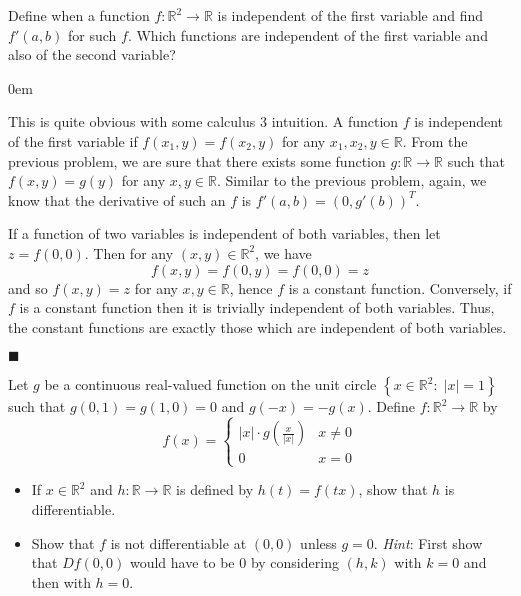 \documentclass[12pt]{article}
\renewcommand{\qed}{\hfill$\blacksquare$}
\renewenvironment{proof}{\begin{addmargin}[1em]{0em}\begin{newproof}}{\end{newproof}\end{addmargin}\qed}
\newenvironment{problem}[2][Problem]{\begin{trivlist}
\item[\hskip \labelsep {\bfseries #1}\hskip \labelsep {\bfseries #2.}]}{\end{trivlist}}
\begin{document}
\begin{problem}{2.3}
Define when a function $f:\mathbb{R}^2 \rightarrow \mathbb{R}$ is independent of the first variable and find $f'\left(a,b\right)$ for such $f$. Which functions are independent of the first variable and also of the second variable?
\end{problem}

\begin{proof}
This is quite obvious with some calculus 3 intuition. A function $f$ is independent of the first variable if $f\left(x_1,y\right) = f\left(x_2,y\right)$ for any $x_1, x_2, y \in \mathbb{R}$. From the previous problem, we are sure that there exists some function $g:\mathbb{R}\rightarrow \mathbb{R}$ such that $f\left(x,y\right) = g\left(y\right)$ for any $x,y\in \mathbb{R}$. Similar to the previous problem, again, we know that the derivative of such an $f$ is $f'\left(a,b\right) = \left(0,g'\left(b\right)\right)^T$.

If a function of two variables is independent of both variables, then let $z = f\left(0,0\right)$. Then for any $\left(x,y\right) \in \mathbb{R}^2$, we have
$$ f\left(x,y\right) = f\left(0,y\right) = f\left(0,0\right) = z$$ and so $f\left(x,y\right) = z$ for any $x,y\in \mathbb{R}$, hence $f$ is a constant function. Conversely, if $f$ is a constant function then it is trivially independent of both variables. Thus, the constant functions are exactly those which are independent of both variables.
\end{proof}







\begin{problem}{2.4}
Let $g$ be a continuous real-valued function on the unit circle $\left\{ x\in \mathbb{R}^2: \; \left|x\right| = 1\right\}$ such that $g\left(0,1\right) = g\left(1,0\right)=0$ and $g\left(-x\right) = -g\left(x\right)$. Define $f:\mathbb{R}^2\rightarrow \mathbb{R}$ by
\begin{equation*}
f\left(x\right) = \left\{ \begin{array}{lr} \left|x\right|\cdot g\left(\frac{x}{\left|x\right|}\right) & x\neq 0 \\ 0 & x=0 \end{array} \right.
\end{equation*}
\begin{itemize}
	\item If $x\in \mathbb{R}^2$ and $h:\mathbb{R}\rightarrow \mathbb{R}$ is defined by $h\left(t\right) = f\left(tx\right)$, show that $h$ is differentiable. \\
	\item Show that $f$ is not differentiable at $\left(0,0\right)$ unless $g=0$. \textit{Hint}: First show that $Df\left(0,0\right)$ would have to be $0$ by considering $\left(h,k\right)$ with $k=0$ and then with $h=0$.
\end{itemize}
\end{problem}
\end{document}
